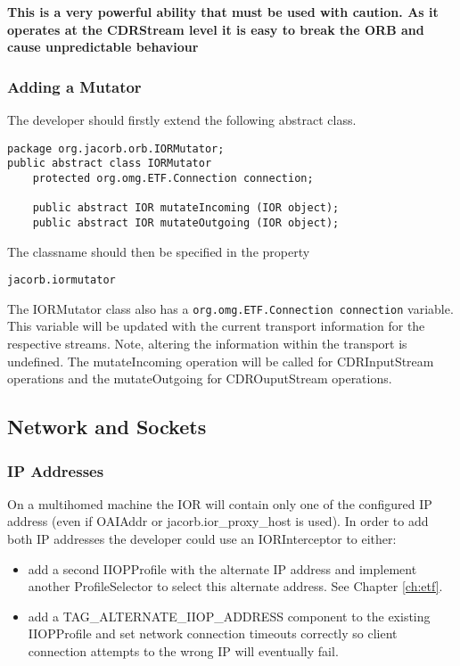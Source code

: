 \textbf{This is a very powerful ability that must be used with caution. As it operates
at the CDRStream level it is easy to break the ORB and cause unpredictable behaviour}

\subsubsection{Adding a Mutator}
The developer should firstly extend the following abstract class.
\begin{small}
\begin{verbatim}
package org.jacorb.orb.IORMutator;
public abstract class IORMutator
    protected org.omg.ETF.Connection connection;

    public abstract IOR mutateIncoming (IOR object);
    public abstract IOR mutateOutgoing (IOR object);
\end{verbatim}
\end{small}
The classname should then be specified in the property
\begin{verbatim}
jacorb.iormutator
\end{verbatim}

The IORMutator class also has a {\tt org.omg.ETF.Connection connection} variable. This
variable will be updated with the current transport information for the respective
streams. Note, altering the information within the transport is undefined. The
mutateIncoming operation will be called for CDRInputStream operations and the
mutateOutgoing for CDROuputStream operations.

\subsection{Network and Sockets}

\subsubsection{IP Addresses}
On a multihomed machine the IOR will contain only one of the configured
IP address (even if OAIAddr or jacorb.ior\_proxy\_host is used). In order to add both IP
addresses the developer could use an IORInterceptor to either:
\begin{itemize}
\item add a second IIOPProfile with the alternate IP address and implement another ProfileSelector to select this alternate address. See Chapter \ref{ch:etf}.
\item add a TAG\_ALTERNATE\_IIOP\_ADDRESS component to the existing IIOPProfile and set network connection timeouts correctly so client connection attempts to the wrong IP will eventually fail.
\end{itemize}


